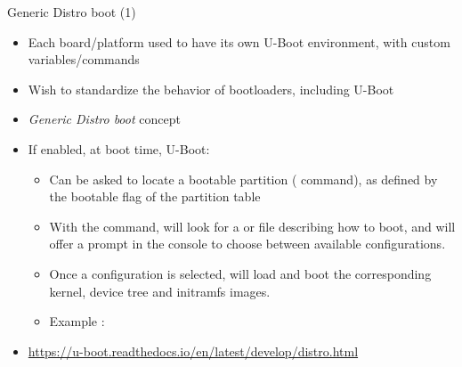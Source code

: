 \begin{frame}{Generic Distro boot (1)}
  \begin{itemize}
  \item Each board/platform used to have its own U-Boot environment,
    with custom variables/commands
  \item Wish to standardize the behavior of bootloaders, including
    U-Boot
  \item {\em Generic Distro boot} concept
  \item If enabled, at boot time, U-Boot:
    \begin{itemize}
    \item Can be asked to locate a bootable partition ( command),
          as defined by the bootable flag of the partition table
    \item With the  command, will look for a
           or 
	  file describing how to boot, and will offer a prompt in the console
          to choose between available configurations.
    \item Once a configuration is selected, will load and boot the
          corresponding kernel, device tree and initramfs images.
    \item Example :\\
    \end{itemize}
  \item \url{https://u-boot.readthedocs.io/en/latest/develop/distro.html}
  \end{itemize}
\end{frame}

